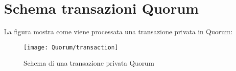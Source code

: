 %
%
\chapter{Schema transazioni Quorum}
%
\label{cap:transaction}
%
La figura mostra come viene processata una transazione privata in Quorum:
%
\begin{figure}[H]
	\centering
	\texttt{[image: Quorum/transaction]}
	\caption{Schema di una transazione privata Quorum}
	\label{fig:schema di una transazione privata quorum}
\end{figure}
%
